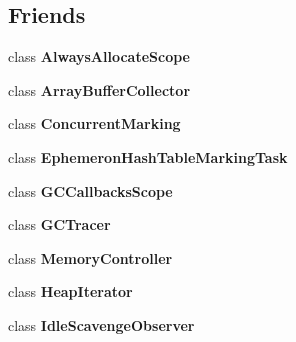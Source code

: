 \subsection*{Friends}
\begin{DoxyCompactItemize}
\item 
\mbox{\label{classv8_1_1internal_1_1Heap_ac91b5d86c9421c14c5d1ac542e048fa7}} 
class {\bfseries Always\+Allocate\+Scope}
\item 
\mbox{\label{classv8_1_1internal_1_1Heap_a852b5dc9fc8c86d5c1fd8993ef5b8b7e}} 
class {\bfseries Array\+Buffer\+Collector}
\item 
\mbox{\label{classv8_1_1internal_1_1Heap_ae39ae5ca1d1541e9048ec5371add15a3}} 
class {\bfseries Concurrent\+Marking}
\item 
\mbox{\label{classv8_1_1internal_1_1Heap_adae8a006dc91c15419cee45dd7813631}} 
class {\bfseries Ephemeron\+Hash\+Table\+Marking\+Task}
\item 
\mbox{\label{classv8_1_1internal_1_1Heap_aa5dafc4b49819817c1ab40d34e4038a2}} 
class {\bfseries G\+C\+Callbacks\+Scope}
\item 
\mbox{\label{classv8_1_1internal_1_1Heap_af0a250e40f134d7b35c7c22304f35304}} 
class {\bfseries G\+C\+Tracer}
\item 
\mbox{\label{classv8_1_1internal_1_1Heap_a6a3b9c9cf8ba580eba543e57bb812177}} 
class {\bfseries Memory\+Controller}
\item 
\mbox{\label{classv8_1_1internal_1_1Heap_a17740079af4633df7d13bb9d3732f54d}} 
class {\bfseries Heap\+Iterator}
\item 
\mbox{\label{classv8_1_1internal_1_1Heap_aa626bcfe03232786e2304e040bb59cc6}} 
class {\bfseries Idle\+Scavenge\+Observer}
\item 
\mbox{\label{classv8_1_1internal_1_1Heap_abe19bf8497a23b6101b9916f8ac1d587}} 

\end{DoxyCompactItemize}
